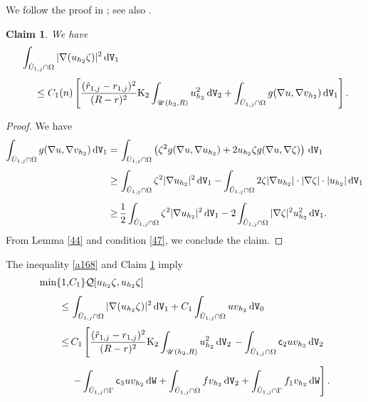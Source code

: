 \documentclass[reqno, 11pt, a4paper]{amsart}
\newtheorem{cl}{Claim}
\numberwithin{equation}{section}
\newcommand{\ops}{\mathcal{Q}}
\newcommand{\ck}{\textnormal K}
\newcommand{\fc}{\mathsf c}
\newcommand{\dwv}{\textnormal{d} \mathtt{V}}
\newcommand{\dww}{\textnormal{d} \mathtt{W}}
\begin{document}
We follow the proof in \cite[Theorem 4.1]{hanlin2011ellipticpartial}; see also \cite[Lemma A.2]{apaza2024yamabecorner}.
\begin{cl} \label{accontb1}
We have
\begin{equation*}
\begin{aligned}
& \int   _{\hat U _{1,j} \cap \Omega }    |\nabla (u_{h_{2}} \zeta  )|^2 \, \dwv _{1}  \\[3pt]
& \quad \ \leq C_1( n) \left[ \frac{(\hat r _{1,j} - r_{1,j} )^2 } {(R-r) ^{2}} \ck _2\int _{\mathscr{U}(h_{2},R)} u_{ h_{2} }^2 \, \dwv _{2}+ \int  _{\hat U _{1,j} \cap \Omega }    g (\nabla u , \nabla v_{ h_{2} }) \, \dwv _{1}  \right].
\end{aligned}
\end{equation*}
\end{cl} 
\begin{proof}
We have 
\begin{align*}
\int _{\hat U _{1,j} \cap \Omega } g(\nabla u , \nabla v_{h_{2}}) \, \dwv _{1} = & \displaystyle \, \int _{\hat U _{1,j} \cap \Omega } \left( \zeta  ^2 g(\nabla u , \nabla u_{h_{2}} ) + 2u_{ h_{2} } \zeta  g(\nabla u , \nabla \zeta   )  \right) \, \dwv _{1} \\[3pt]
 \geq & \displaystyle \,   \int _{\hat U _{1,j} \cap \Omega } \zeta  ^2  | \nabla u_{h_{2}} |^2 \, \dwv _{1}   - \int _{\hat U _{1,j} \cap \Omega } 2 \zeta   |\nabla u _{h_{2}}  | \cdot |\nabla \zeta   |  \cdot |u_{h_{2}} |  \, \dwv _{1} \\[5pt]
 \geq & \displaystyle \,  \frac{1}{2}\int _{\hat U _{1,j} \cap \Omega } \zeta  ^2  | \nabla u_{h_{2}} |^2 \, \dwv _{1}   - 2\int _{\hat U _{1,j} \cap \Omega }   |\nabla \zeta   |^2  u_{h_{2}}  ^2 \, \dwv _{1} .
\end{align*}
From Lemma \ref{44} and condition \ref{47}, we conclude the claim.\end{proof}


The inequality \eqref{a168} and  Claim \ref{accontb1} imply 
\begin{equation} \label{a169}
\begin{aligned}
\min \{1, & C_1\}  \ops [u_{h_{2}}  \zeta , u_{h_{2}}  \zeta] \\[3pt]
 \leq & \displaystyle \,  \int  _ {\hat U _{1,j} \cap \Omega }  |\nabla (u_{h_{2}}  \zeta  )|^2 \, \dwv _{1}   + C_1 \int  _{\hat U _{1,j} \cap \Omega }  u v_{h_{2}} \,  \dwv _{0}  \\[3pt]
 \leq  & \displaystyle \,    C_1 \left[ \frac{ (\hat r _{1,j} - r_{1,j})^2}{(R-r) ^{2}} \ck _{2} \int _{\mathscr{U}(h_{2},R)} u_{h_{2}}  ^2 \, { \dwv _{2}} \right. - \int  _{\hat U _{1,j} \cap \Omega } \fc  _2 u v_{h_{2}}   \, \dwv _{2}    \\[5pt]
& \displaystyle \,  \left.      - \int  _{ \hat U _{1,j} \cap \Gamma} \fc _3 u v_{h_{2}}  \, \dww   + \int  _{\hat U _{1,j} \cap \Omega }    f v_{h_{2}}  \, \dwv _{2} + \int_{\hat U _{1,j} \cap \Gamma }  f_1 v _{h_{2}} \, \dww  \right]  .
\end{aligned} 
\end{equation}
\end{document}
